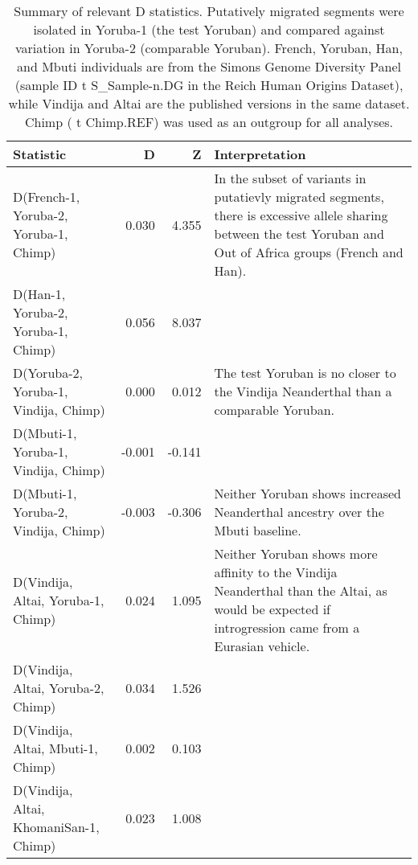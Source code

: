 \begin{table}[ht]
\centering
\begin{tabular}{lrrl}
  \hline
Statistic & D & Z & Interpretation \\ 
  \hline
D(French-1, Yoruba-2, Yoruba-1, Chimp) & 0.030 & 4.355 & In the subset of variants in putatievly migrated segments, there is excessive allele sharing between the test Yoruban and Out of Africa groups (French and Han). \\ 
  D(Han-1, Yoruba-2, Yoruba-1, Chimp) & 0.056 & 8.037 &  \\ 
  D(Yoruba-2, Yoruba-1, Vindija, Chimp) & 0.000 & 0.012 & The test Yoruban is no closer to the Vindija Neanderthal than a comparable Yoruban. \\ 
  D(Mbuti-1, Yoruba-1, Vindija, Chimp) & -0.001 & -0.141 &  \\ 
  D(Mbuti-1, Yoruba-2, Vindija, Chimp) & -0.003 & -0.306 & Neither Yoruban shows increased Neanderthal ancestry over the Mbuti baseline. \\ 
  D(Vindija, Altai, Yoruba-1, Chimp) & 0.024 & 1.095 & Neither Yoruban shows more affinity to the Vindija Neanderthal than the Altai, as would be expected if introgression came from a Eurasian vehicle. \\ 
  D(Vindija, Altai, Yoruba-2, Chimp) & 0.034 & 1.526 &  \\ 
  D(Vindija, Altai, Mbuti-1, Chimp) & 0.002 & 0.103 &  \\ 
  D(Vindija, Altai, KhomaniSan-1, Chimp) & 0.023 & 1.008 &  \\ 
   \hline
\end{tabular}
\caption{Summary of relevant D statistics. Putatively migrated segments were isolated in Yoruba-1 (the test Yoruban) and compared against variation in Yoruba-2 (comparable Yoruban). French, Yoruban, Han, and Mbuti individuals are from the Simons Genome Diversity Panel (sample ID {	t S_Sample-n.DG} in the Reich Human Origins Dataset), while Vindija and Altai are the published versions in the same dataset. Chimp ({	t Chimp.REF}) was used as an outgroup for all analyses.} 
\label{table:dstats_summary}
\end{table}
